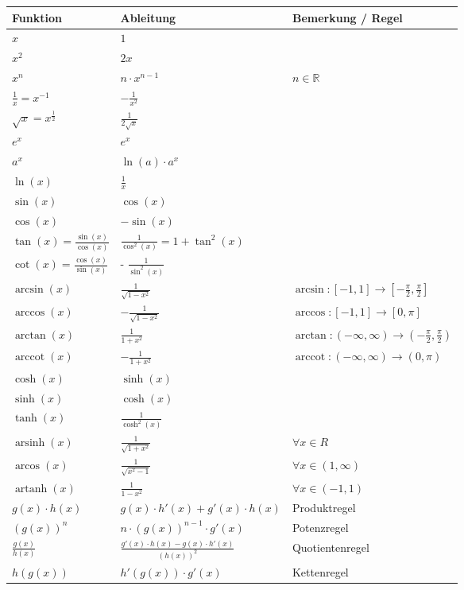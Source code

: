 \documentclass[25pt]{sciposter}
\newcommand{\R}{\mathbb{R}}
\begin{document}
\begin{multicols}{3}
{\renewcommand{\arraystretch}{1.5}
\begin{table}[]
	\begin{tabular}{@{} p{} p{} p{} @{}}
		\toprule
		Funktion & Ableitung & Bemerkung / Regel\\ \midrule
		  $x$ & $1$ &   \\
		  $x^2$& $2x$ &   \\
		  $x^n$& $n\cdot x^{n-1}$ & $n \in \R$  \\
		  $\frac{1}{x} = x^{-1}$ & $- \frac{1}{x^2}$ & \\
		  $\sqrt{x} = x^{\frac{1}{2}}$ & $\frac{1}{2\sqrt{x}}$ & \\ 
		   $e^x$ & $e^x$ & \\
		  $a^x$ & $\ln(a) \cdot a^x$& \\
		  $\ln(x)$ & $\frac{1}{x}$ & \\ \midrule
		  $\sin(x)$ & $\cos(x)$ & \\
		  $\cos(x)$ & $- \sin(x)$ & \\ 
		  $\tan(x) = \frac{\sin(x)}{\cos(x)}$ & $\frac{1}{\cos^2(x)} = 1 + \tan^2(x)$ &\\
		  $\cot(x) = \frac{\cos(x)}{\sin(x)}$ & - $\frac{1}{\sin^2(x)}$ & \\ 
		  $\arcsin(x)$ & $\frac{1}{\sqrt{1 - x^2}}$ & $ \arcsin : [-1,1] \to [-\frac{\pi}{2},\frac{\pi}{2}]$\\
		  $\arccos(x)$ & $ - \frac{1}{\sqrt{1-x^2}}$ & $\arccos : [-1,1] \to [0, \pi]$\\
		  $\arctan(x)$ & $\frac{1}{1+x^2}$ & $\arctan:(-\infty, \infty) \to (- \frac{\pi}{2},\frac{\pi}{2})$\\
		  $\operatorname{arccot}(x)$ & $ - \frac{1}{1+x^2} $ & $\operatorname{arccot} : (-\infty, \infty) \to (0,\pi)$\\
		  \midrule
		  $\cosh(x)$ & $\sinh(x)$ &\\
		  $\sinh(x)$ & $\cosh(x)$ & \\
		  $\tanh(x)$ & $\frac{1}{\cosh^2(x)}$ & \\
		  $\operatorname{arsinh}(x)$ & $\frac{1}{\sqrt{1+x^2}}$ & $\forall x \in R$\\
		  $\operatorname{arcos}(x)$ & $\frac{1}{\sqrt{x^2 - 1}}$ & $\forall x \in (1, \infty)$\\		  $\operatorname{artanh}(x)$ & $\frac{1}{1-x^2}$ & $\forall x \in (-1,1)$\\
		  \midrule
		  $g(x) \cdot h(x)$ & $g(x) \cdot h'(x) + g'(x) \cdot h(x)$ & Produktregel\\
		  $\left(g(x)\right)^n$ & $n \cdot \left( g(x) \right)^{n-1} \cdot g'(x)$ & Potenzregel\\
		  $\frac{g(x)}{h(x)}$ & $\frac{ g'(x) \cdot h(x) - g(x)\cdot h'(x)}{\left(h(x)\right) ^2}$ & Quotientenregel\\
		  $h(g(x))$ & $h'(g(x)) \cdot g'(x)$ & Kettenregel\\
		  \bottomrule
	\end{tabular}
\end{table}
}





\end{multicols}
\end{document}

